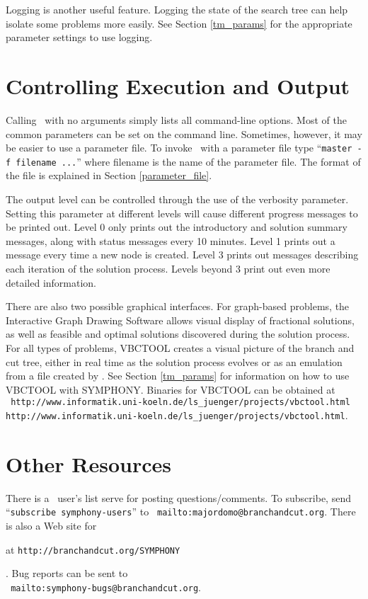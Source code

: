 Logging is another useful feature. Logging the state of the search tree can
help isolate some problems more easily. See Section \ref{tm_params}
for the appropriate parameter settings to use logging.

\section{Controlling Execution and Output}
\label{output}
Calling \BB\ with no arguments simply lists all command-line options.  Most of
the common parameters can be set on the command line. Sometimes, however, it
may be easier to use a parameter file. To invoke \BB\ with a parameter file
type ``{\tt master -f filename ...}'' where filename is the name of the
parameter file. The format of the file is explained in Section
\ref{parameter_file}. 

The output level can be controlled through the use of the verbosity
parameter. Setting this parameter at different levels will cause
different progress messages to be printed out. Level 0 only prints out
the introductory and solution summary messages, along with status
messages every 10 minutes. Level 1 prints out a message every time a
new node is created. Level 3 prints out messages describing each
iteration of the solution process. Levels beyond 3 print out even more
detailed information.

There are also two possible graphical interfaces. For graph-based
problems, the Interactive Graph Drawing Software allows visual display
of fractional solutions, as well as feasible and optimal solutions
discovered during the solution process. For all types of problems,
VBCTOOL creates a visual picture of the branch and cut tree, either
in real time as the solution process evolves or as an emulation from a
file created by
\BB. See Section \ref{tm_params} for information on how to use VBCTOOL
with SYMPHONY. Binaries for VBCTOOL can be obtained at \\ 
{\tt \htmladdnormallink
{http://www.informatik.uni-koeln.de/ls\_juenger/projects/vbctool.html}
{http://www.informatik.uni-koeln.de/ls\_juenger/projects/vbctool.html}}.


\section{Other Resources}
\label{resources}
There is a \BB\ user's list serve for posting questions/comments.
To subscribe, send ``{\tt subscribe symphony-users}'' to
{\tt {}
{mailto:majordomo@branchandcut.org}}. There is also a Web site for
\begin{latexonly}
at {\tt http://branchandcut.org/SYMPHONY}
\end{latexonly}.  
Bug reports can be sent to \\
{\tt {}
{mailto:symphony-bugs@branchandcut.org}}.


